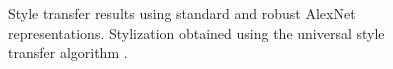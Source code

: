 \begin{figure}[t]
\vspace{-.9\baselineskip}

\vspace{-.9\baselineskip}
\vspace{-0.5\baselineskip}

\caption{Style transfer results using standard and robust AlexNet representations. Stylization obtained using the universal style transfer algorithm \cite{li_2017_universal}.}
\label{fig:supp_st}
\vspace{-0.8 cm}
\end{figure}
